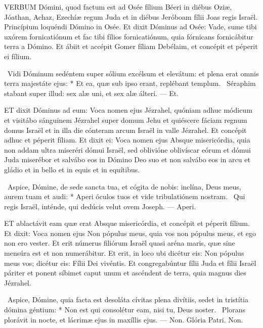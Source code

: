 



\lettrine[lines=2]{V}{ERBUM} Dómini, quod factum est ad Osée fílium Béeri in diébus Oziæ, Jóathan, Achaz, Ezechíæ regum Juda et in diébus Jeróboam fílii Joas regis Israël. Princípium loquéndi Dómino in Osée. Et dixit Dóminus ad Osée: Vade, sume tibi uxórem fornicatiónum et fac tibi fílios fornicatiónum, quia fórnicans fornicábitur terra a Dómino. Et ábiit et accépit Gomer fíliam Debélaim, et concépit et péperit ei fílium.

\R\ Vidi Dóminum sedéntem super sólium excélsum et elevátum: et plena erat omnis terra majestáte ejus: * Et ea, quæ sub ipso erant, replébant templum. \V\ Séraphim stabant super illud: sex alæ uni, et sex alæ álteri. — Et.


\lettrine[lines=2]{E}{T} dixit Dóminus ad eum: Voca nomen ejus Jézrahel, quóniam adhuc módicum et visitábo sánguinem Jézrahel super domum Jehu et quiéscere fáciam regnum domus Israël et in illa die cónteram arcum Israël in valle Jézrahel. Et concépit adhuc et péperit fíliam. Et dixit ei: Voca nomen ejus Absque misericórdia, quia non addam ultra miseréri dómui Israël, sed oblivióne oblivíscar eórum et dómui Juda miserébor et salvábo eos in Dómino Deo suo et non salvábo eos in arcu et gládio et in bello et in equis et in equítibus.

\R\ Aspice, Dómine, de sede sancta tua, et cógita de nobis: inclína, Deus meus, aurem tuam et audi: * Aperi óculos tuos et vide tribulatiónem nostram. \V\ Qui regis Israël, inténde, qui dedúcis velut ovem Joseph. — Aperi.


\lettrine[lines=2]{E}{T} ablactávit eam quæ erat Absque misericórdia, et concépit et péperit fílium. Et dixit: Voca nomen ejus Non pópulus meus, quia vos non pópulus meus, et ego non ero vester. Et erit númerus filiórum Israël quasi aréna maris, quæ sine mensúra est et non numerábitur. Et erit, in loco ubi dicétur eis: Non pópulus meus vos; dicétur eis: Fílii Dei vivéntis. Et congregabúntur fílii Juda et fílii Israël páriter et ponent síbimet caput unum et ascéndent de terra, quia magnus dies Jézrahel.

\R\ Aspice, Dómine, quia facta est desoláta cívitas plena divítiis, sedet in tristítia dómina géntium: * Non est qui consolétur eam, nisi tu, Deus noster. \V\ Plorans plorávit in nocte, et lácrimæ ejus in maxíllis ejus. — Non. Glória Patri. Non.

